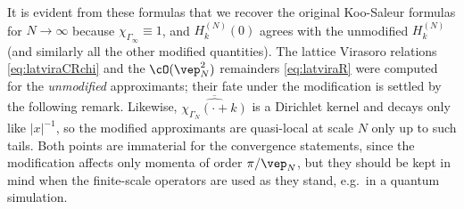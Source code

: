 \documentclass[a4paper, 11pt]{article}
\DeclareMathOperator{\1}{\mathds{1}}
\begin{document}
It is evident from these formulas that we recover the original Koo-Saleur formulas for $N\rightarrow\infty$ because $\chi_{\Gamma_{\infty}}\equiv1$, and $H^{(N)}_{k}(0)$ agrees with the unmodified $H^{(N)}_{k}$ (and similarly all the other modified quantities). The lattice Virasoro relations \eqref{eq:latviraCRchi} and the $\cO(\vep_{N}^{2})$ remainders \eqref{eq:latviraR} were computed for the \emph{unmodified} approximants; their fate under the modification is settled by the following remark. Likewise, $\overline{\widehat{\chi_{\Gamma_{N}}(\cdot+k)}}$ is a Dirichlet kernel and decays only like $|x|^{-1}$, so the modified approximants are quasi-local at scale $N$ only up to such tails. Both points are immaterial for the convergence statements, since the modification affects only momenta of order $\pi/\vep_{N}$, but they should be kept in mind when the finite-scale operators are used as they stand, e.g.~in a quantum simulation.
\end{document}
